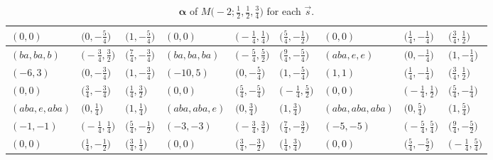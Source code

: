 \documentclass[pdftex]{sigma}
\def\bal{\boldsymbol{\alpha}}
\theoremstyle{definition}
\numberwithin{equation}{section}
\begin{document}
\begin{landscape}
\begin{table}[th]
\begin{tabular}{|lll|lll|lll|}
\\
$(0, 0)$ & $\bigl(0, -\frac{5}{4}\bigr)$ & $\bigl(1, -\frac{5}{4}\bigr)$ & $(0, 0)$ & $\bigl(-\frac{1}{4}, \frac{1}{4}\bigr)$ & $\bigl(\frac{5}{4}, -\frac{1}{2}\bigr)$ & $(0, 0)$ & $\bigl(\frac{1}{4}, -\frac{1}{4}\bigr)$ & $\bigl(\frac{3}{4}, \frac{1}{2}\bigr)$
\\\hline
$(ba, ba, b)$ & $\bigl(-\frac{3}{4}, \frac{3}{2}\bigr)$ & $\bigl(\frac{7}{4}, -\frac{3}{4}\bigr)$ & $(ba, ba, ba)$ & $\bigl(-\frac{5}{4}, \frac{5}{2}\bigr)$ & $\bigl(\frac{9}{4}, -\frac{5}{4}\bigr)$ & $(aba, e, e)$ & $\bigl(0, -\frac{1}{4}\bigr)$ & $\bigl(1, -\frac{1}{4}\bigr)$
\\
$(-6, 3)$ & $\bigl(0, -\frac{3}{4}\bigr)$ & $\bigl(1, -\frac{3}{4}\bigr)$ & $(-10, 5)$ & $\bigl(0, -\frac{5}{4}\bigr)$ & $\bigl(1, -\frac{5}{4}\bigr)$ & $(1, 1)$ & $\bigl(\frac{1}{4}, -\frac{1}{4}\bigr)$ & $\bigl(\frac{3}{4}, \frac{1}{2}\bigr)$
\\
$(0, 0)$ & $\bigl(\frac{3}{4}, -\frac{3}{4}\bigr)$ & $\bigl(\frac{1}{4}, \frac{3}{2}\bigr)$ & $(0, 0)$ & $\bigl(\frac{5}{4}, -\frac{5}{4}\bigr)$ & $\bigl(-\frac{1}{4}, \frac{5}{2}\bigr)$ & $(0, 0)$ & $\bigl(-\frac{1}{4}, \frac{1}{2}\bigr)$ & $\bigl(\frac{5}{4}, -\frac{1}{4}\bigr)$
\\\hline
$(aba, e, aba)$ & $\bigl(0, \frac{1}{4}\bigr)$ & $\bigl(1, \frac{1}{4}\bigr)$ & $(aba, aba, e)$ & $\bigl(0, \frac{3}{4}\bigr)$ & $\bigl(1, \frac{3}{4}\bigr)$ & $(aba, aba, aba)$ & $\bigl(0, \frac{5}{4}\bigr)$ & $\bigl(1, \frac{5}{4}\bigr)$
\\
$(-1, -1)$ & $\bigl(-\frac{1}{4}, \frac{1}{4}\bigr)$ & $\bigl(\frac{5}{4}, -\frac{1}{2}\bigr)$ & $(-3, -3)$ & $\bigl(-\frac{3}{4}, \frac{3}{4}\bigr)$ & $\bigl(\frac{7}{4}, -\frac{3}{2}\bigr)$ & $(-5, -5)$ & $\bigl(-\frac{5}{4}, \frac{5}{4}\bigr)$ & $\bigl(\frac{9}{4}, -\frac{5}{2}\bigr)$
 \\
$(0, 0)$ & $\bigl(\frac{1}{4}, -\frac{1}{2}\bigr)$ & $\bigl(\frac{3}{4}, \frac{1}{4}\bigr)$ & $(0, 0)$ & $\bigl(\frac{3}{4}, -\frac{3}{2}\bigr)$ & $\bigl(\frac{1}{4}, \frac{3}{4}\bigr)$ & $(0, 0)$ & $\bigl(\frac{5}{4}, -\frac{5}{2}\bigr)$ & $\bigl(-\frac{1}{4}, \frac{5}{4}\bigr)$
\\\hline
\end{tabular}
\caption{$\bal$ of $M\bigl( -2;\frac{1}{2},\frac{1}{2},\frac{3}{4} \bigr)$ for each $\vec s$.}\label{tab:balinrangeGeneral}
\end{table}

\end{landscape}
\end{document}

